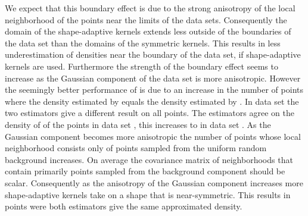 			We expect that this boundary effect is due to the strong anisotropy of the local neighborhood of the points near the limits of the data sets. Consequently the domain of the shape-adaptive kernels extends less outside of the boundaries of the data set than the domains of the symmetric kernels. This results in less underestimation of densities near the boundary of the data set, if shape-adaptive kernels are used.
			Furthermore the strength of the boundary effect seems to increase as the Gaussian component of the data set is more anisotropic. However the seemingly better performance of \sambe is due to an increase in the number of points where the density estimated by \sambe equals the density estimated by \mbe. In data set \ferdosiOne the two estimators give a different result on all points. The estimators agree on the density of  of the points in data set \baakmanOne, this increases to  in data set \baakmanFive.
			As the Gaussian component becomes more anisotropic the number of points whose local neighborhood consists only of points sampled from the uniform random background increases. On average the covariance matrix of neighborhoods that contain primarily points sampled from the background component should be scalar. Consequently as the anisotropy of the Gaussian component increases more shape-adaptive kernels take on a shape that is near-symmetric. This results in points were both estimators give the same approximated density.

